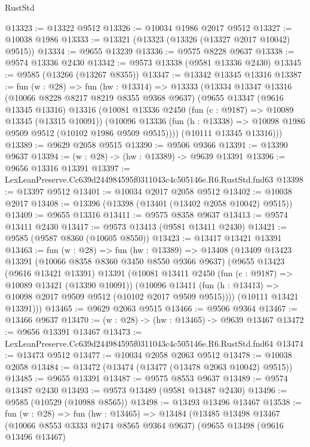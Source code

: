 \begin{lexlean}{RustStd}
\begin{coremodule}
@13323 := @13322 @9512
@13326 := @10034 @1986 @2017 @9512
@13327 := @10038 @1986
@13333 := @13321 (@13323 (@13326 (@13327 @2017 @10042) @9515))
@13334 := @9655 @13239
@13336 := @9575 @8228 @9637
@13338 := @9574 @13336 @2430
@13342 := @9573 @13338 (@9581 @13336 @2430)
@13345 := @9585 (@13266 (@13267 @8355))
@13347 := @13342 @13345 @13316
@13387 := fun (w : @28) =>
  fun (hw : @13314) =>
  @13333
    (@13334
      @13347
      @13316
      (@10066 @8228 @8217 @8219 @8355 @9368 @9637)
      (@9655
        @13347
        (@9616 @13345 @13316)
        @13316
        (@10081
          @13336
          @2450
          (fun (c : @9187) => @10089 @13345 (@13315 @10091))
          (@10096 @13336 (fun (h : @13338) => @10098 @1986 @9509 @9512 (@10102 @1986 @9509 @9515))))
        (@10111 @13345 @13316)))
@13389 := @9629 @2058 @9515
@13390 := @9506 @9366
@13391 := @13390 @9637
@13394 := (w : @28) -> (hw : @13389) -> @9639 @13391
@13396 := @9656 @13316 @13391
@13397 := LexLeanPreserve.Cc639d244984595f0311043c4c505146e.R6.RustStd.fnd63
@13398 := @13397 @9512
@13401 := @10034 @2017 @2058 @9512
@13402 := @10038 @2017
@13408 := @13396 (@13398 (@13401 (@13402 @2058 @10042) @9515))
@13409 := @9655 @13316
@13411 := @9575 @8358 @9637
@13413 := @9574 @13411 @2430
@13417 := @9573 @13413 (@9581 @13411 @2430)
@13421 := @9585 (@9587 @8360 (@10605 @8550))
@13423 := @13417 @13421 @13391
@13463 := fun (w : @28) =>
  fun (hw : @13389) =>
  @13408
    (@13409
      @13423
      @13391
      (@10066 @8358 @8360 @3450 @8550 @9366 @9637)
      (@9655
        @13423
        (@9616 @13421 @13391)
        @13391
        (@10081
          @13411
          @2450
          (fun (c : @9187) => @10089 @13421 (@13390 @10091))
          (@10096 @13411 (fun (h : @13413) => @10098 @2017 @9509 @9512 (@10102 @2017 @9509 @9515))))
        (@10111 @13421 @13391)))
@13465 := @9629 @2063 @9515
@13466 := @9506 @9364
@13467 := @13466 @9637
@13470 := (w : @28) -> (hw : @13465) -> @9639 @13467
@13472 := @9656 @13391 @13467
@13473 := LexLeanPreserve.Cc639d244984595f0311043c4c505146e.R6.RustStd.fnd64
@13474 := @13473 @9512
@13477 := @10034 @2058 @2063 @9512
@13478 := @10038 @2058
@13484 := @13472 (@13474 (@13477 (@13478 @2063 @10042) @9515))
@13485 := @9655 @13391
@13487 := @9575 @8553 @9637
@13489 := @9574 @13487 @2430
@13493 := @9573 @13489 (@9581 @13487 @2430)
@13496 := @9585 (@10529 (@10988 @8565))
@13498 := @13493 @13496 @13467
@13538 := fun (w : @28) =>
  fun (hw : @13465) =>
  @13484
    (@13485
      @13498
      @13467
      (@10066 @8553 @3333 @2474 @8565 @9364 @9637)
      (@9655
        @13498
        (@9616 @13496 @13467)

\end{coremodule}
\end{lexlean}
